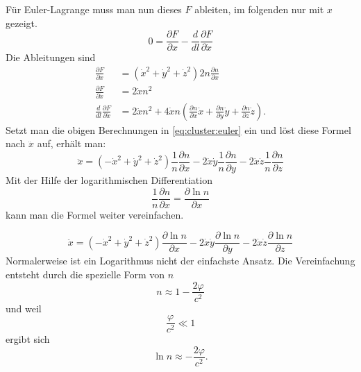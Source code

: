 \begin{refsection}
Für Euler-Lagrange muss man nun dieses \(F\) ableiten, im folgenden
nur mit \(x\) gezeigt.
\begin{equation}
  \label{eq:cluster:euler}
  0 = \frac{\partial F}{\partial x} - \frac{d}{d l} \frac{\partial
    F}{\partial \dot{x}}
\end{equation}
Die Ableitungen sind
\begin{align*}
  \frac{\partial F}{\partial x} &= (\dot{x}^2+\dot{y}^2+\dot{z}^2) 2n
                                  \frac{\partial n}{\partial x}\\
  \frac{\partial F}{\partial\dot{x}} &= 2\dot{x}n^2\\
  \frac{d}{d l}\frac{\partial F}{\partial\dot{x}} &= 2\ddot{x}n^2 + 4\dot{x}n
                                \left(\frac{\partial n}{\partial x}\dot{x} +
                                \frac{\partial n}{\partial y}\dot{y} +
                                \frac{\partial n}{\partial z}\dot{z} \right).
\end{align*}
Setzt man die obigen Berechnungen in \ref{eq:cluster:euler} ein und
löst diese Formel nach \(\ddot{x}\) auf, erhält man:
\begin{equation}
  \ddot{x} = (-\dot{x}^2+\dot{y}^2+\dot{z}^2)
  \frac{1}{n}\frac{\partial n}{\partial x} -
  2\dot{x}\dot{y} \frac{1}{n}\frac{\partial n}{\partial y} -
  2\dot{x}\dot{z} \frac{1}{n}\frac{\partial n}{\partial z}
\end{equation}
Mit der Hilfe der logarithmischen Differentiation
\begin{equation*}
  \frac{1}{n} \frac{\partial n}{\partial x} = \frac{\partial \ln
    n}{\partial x}
\end{equation*}
kann man die Formel weiter vereinfachen.

\begin{equation}
  \ddot{x} = (-\dot{x}^2+\dot{y}^2+\dot{z}^2) \frac{\partial \ln
    n}{\partial x} - 2\dot{x}\dot{y} \frac{\partial \ln n}{\partial y}
  - 2\dot{x}\dot{z} \frac{\partial \ln n}{\partial z}
\end{equation}
Normalerweise ist ein Logarithmus nicht der einfachste Ansatz.  Die
Vereinfachung entsteht durch die spezielle Form von \(n\)
\begin{equation*}
  n \approx 1-\frac{2\varphi}{c^2}
\end{equation*}
und weil
\begin{equation*}
  \frac{\varphi}{c^2} \ll 1
\end{equation*}
ergibt sich
\begin{equation*}
  \ln n \approx -\frac{2\varphi}{c^2}.
\end{equation*}


\end{refsection}
